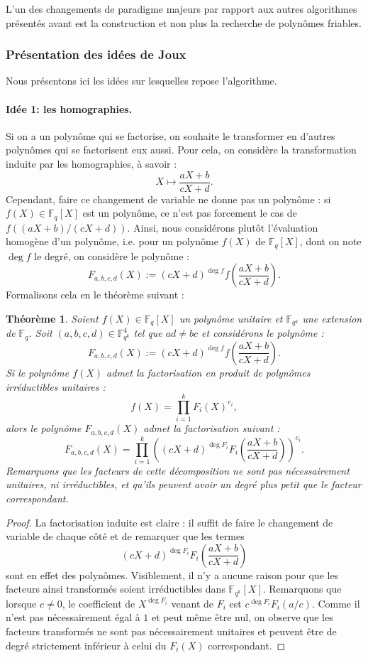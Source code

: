 \documentclass[a4paper, titlepage, 11pt]{article}
\newtheorem{theo}{Théorème}[section]
\theoremstyle{definition}
\theoremstyle{remark}
\def\gf #1{\mathbb{F}_{#1}}
\begin{document}
L'un des changements de paradigme majeurs par rapport aux autres algorithmes présentés avant est la construction et non plus la recherche de polynômes friables.

\subsubsection{Présentation des idées de Joux}\label{ss-sec:idees}

Nous présentons ici les idées sur lesquelles repose l'algorithme.

\paragraph{Idée 1: les homographies.} Si on a un polynôme qui se factorise, on souhaite le transformer en d'autres polynômes qui se factorisent eux aussi. Pour cela, on considère la transformation induite par les homographies, à savoir :
$$X \mapsto \frac{aX+b}{cX+d}.$$
Cependant, faire ce changement de variable ne donne pas un polynôme : si $f(X) \in\gf{q}[X]$ est un polynôme, ce n'est pas forcement le cas de $f((aX+b)/(cX+d))$. Ainsi, nous considérons plutôt l'évaluation homogène d'un polynôme, i.e. pour un polynôme $f(X)$ de $\gf{q}[X]$, dont on note $\deg f$ le degré, on considère le polynôme :
$$F_{a,b,c,d}(X) := (cX+d)^{\deg f} f \left(\frac{aX+b}{cX+d}\right).$$
Formalisons cela en le théorème suivant :
\begin{theo}
Soient $f(X) \in \gf{q}[X]$ un polynôme unitaire et $\gf{q^k}$ une extension de $\gf{q}$. Soit $(a,b,c,d) \in \gf{q^k}^4$ tel que $ad \neq bc$ et considérons le polynôme :
$$F_{a,b,c,d}(X) := (cX+d)^{\deg f} f \left(\frac{aX+b}{cX+d}\right).$$
Si le polynôme $f(X)$ admet la factorisation en produit de polynômes irréductibles unitaires : $$f(X) = \prod_{i=1}^k F_i(X)^{e_i},$$
alors le polynôme $F_{a,b,c,d}(X)$ admet la factorisation suivant :
$$F_{a,b,c,d}(X) = \prod_{i=1}^k {\left( (cX+d)^{\deg F_i} F_i\left(\frac{aX+b}{cX+d}\right)\right)}^{e_i}.$$
Remarquons que les facteurs de cette décomposition ne sont pas nécessairement unitaires, ni irréductibles, et qu'ils peuvent avoir un degré plus petit que le facteur correspondant.
\end{theo}
\begin{proof}
La factorisation induite est claire : il suffit de faire le changement de variable de chaque côté et de remarquer que les termes
$$(cX+d)^{\deg F_i} F_i\left(\frac{aX+b}{cX+d}\right)$$
sont en effet des polynômes. Visiblement, il n'y a aucune raison pour que les facteurs ainsi transformés soient irréductibles dans $\gf{q^k}[X]$. Remarquons que lorsque $c \neq 0$, le coefficient de $X^{\deg{F_i}}$ venant de $F_i$ est $c^{\deg F_i}F_i(a/c)$. Comme il n'est pas nécessairement égal à $1$ et peut même être nul, on observe que les facteurs transformés ne sont pas nécessairement unitaires et peuvent être de degré strictement inférieur à celui du $F_i(X)$ correspondant.
\end{proof}
\end{document}
